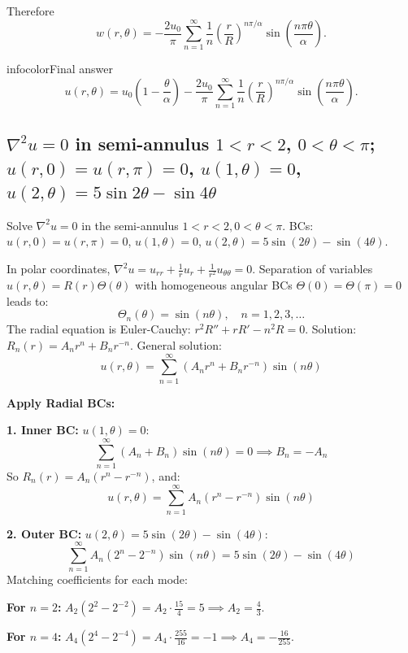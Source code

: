 \documentclass[a4paper,11pt]{article} %
\newenvironment{summarybox}[1][]{\begin{custombox}[#1]{infocolor}{Final answer}}{\end{custombox}}
\begin{document}
Therefore
\[
w(r,\theta)=
-\frac{2u_0}{\pi}
\sum_{n=1}^\infty
\frac1n
\left(\frac{r}{R}\right)^{n\pi/\alpha}
\sin\!\left(\frac{n\pi\theta}{\alpha}\right).
\]

\begin{summarybox}
\[
u(r,\theta)=
u_0\!\left(1-\frac{\theta}{\alpha}\right)
-
\frac{2u_0}{\pi}
\sum_{n=1}^\infty
\frac1n
\left(\frac{r}{R}\right)^{n\pi/\alpha}
\sin\!\left(\frac{n\pi\theta}{\alpha}\right).
\]
\end{summarybox}
\subsection{\texorpdfstring{$\nabla^2 u = 0$ in semi-annulus $1<r<2$, $0<\theta<\pi$; $u(r,0)=u(r,\pi)=0$, $u(1,\theta)=0$, $u(2,\theta)=5\sin 2\theta-\sin 4\theta$}{Laplace in semi-annulus: zero on straight edges and inner arc, sine data on outer arc}}

\begin{problembox}
Solve $\nabla^2 u = 0$ in the semi-annulus $1 < r < 2, 0 < \theta < \pi$.
BCs: $u(r, 0) = u(r, \pi) = 0$, $u(1, \theta) = 0$,
$u(2, \theta) = 5\sin(2\theta) - \sin(4\theta)$.
\end{problembox}

In polar coordinates, $\nabla^2 u = u_{rr} + \frac{1}{r}u_r + \frac{1}{r^2}u_{\theta\theta} = 0$.
Separation of variables $u(r,\theta) = R(r)\Theta(\theta)$ with homogeneous angular BCs $\Theta(0)=\Theta(\pi)=0$ leads to:
$$ \Theta_n(\theta) = \sin(n\theta), \quad n = 1, 2, 3, \dots $$
The radial equation is Euler-Cauchy: $r^2 R'' + r R' - n^2 R = 0$.
Solution: $R_n(r) = A_n r^n + B_n r^{-n}$.
General solution:
$$ u(r, \theta) = \sum_{n=1}^{\infty} (A_n r^n + B_n r^{-n}) \sin(n\theta) $$

\textbf{Apply Radial BCs:}

\textbf{1. Inner BC:} $u(1, \theta) = 0$:
$$ \sum_{n=1}^{\infty} (A_n + B_n) \sin(n\theta) = 0 \implies B_n = -A_n $$
So $R_n(r) = A_n(r^n - r^{-n})$, and:
$$ u(r, \theta) = \sum_{n=1}^{\infty} A_n (r^n - r^{-n}) \sin(n\theta) $$

\textbf{2. Outer BC:} $u(2, \theta) = 5\sin(2\theta) - \sin(4\theta)$:
$$ \sum_{n=1}^{\infty} A_n (2^n - 2^{-n}) \sin(n\theta) = 5\sin(2\theta) - \sin(4\theta) $$
Matching coefficients for each mode:

\textbf{For $n=2$:} $A_2(2^2 - 2^{-2}) = A_2 \cdot \tfrac{15}{4} = 5 \implies A_2 = \tfrac{4}{3}$.

\textbf{For $n=4$:} $A_4(2^4 - 2^{-4}) = A_4 \cdot \tfrac{255}{16} = -1 \implies A_4 = -\tfrac{16}{255}$.
\end{document}
